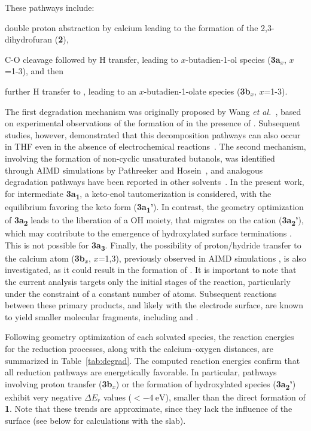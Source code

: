 \documentclass[twoside,twocolumn,9pt]{article}
\begin{document}
These pathways include: {\begin{inparaenum}[(i)]
	\item double proton abstraction by calcium leading to the formation of the 2,3-dihydrofuran (\textbf{2}),
	\item C-O cleavage followed by H transfer, leading to $x$-butadien-1-ol species (\textbf{3a}$_x$, $x$=1-3), and then
	\item further H transfer to , leading to an $x$-butadien-1-olate species (\textbf{3b}$_x$, $x$=1-3).
\end{inparaenum}
The first degradation mechanism was originally proposed by Wang \textit{et al.}~\cite{wangPlatingStrippingCalcium2018}, based on experimental observations of the formation of  in the presence of . 
Subsequent studies, however, demonstrated that this decomposition pathways can also occur in THF even in the absence of electrochemical reactions~\cite{taUnderstandingCaElectrodeposition2019}. 
The second mechanism, involving the formation of non-cyclic unsaturated butanols, was identified through AIMD simulations by Pathreeker and Hosein~\cite{pathreekerWhyTetrahydrofuranGood2021}, and analogous degradation pathways have been reported in other solvents~\cite{yamijalaStabilityCalciumIon2021}. 
In the present work, for intermediate \textbf{3a\textsubscript{1}}, a keto-enol tautomerization is considered, with the equilibrium favoring the keto form (\textbf{3a\textsubscript{1}'}). 
In contrast, the geometry optimization of \textbf{3a\textsubscript{2}} leads to the liberation of a OH moiety, that migrates on the  cation  (\textbf{3a\textsubscript{2}'}), which may contribute to the emergence of hydroxylated surface terminations \cite{fujimoriInteractionWaterCaO2016a}. 
This is not possible for \textbf{3a\textsubscript{3}}.
Finally, the possibility of proton/hydride transfer to the calcium atom (\textbf{3b}$_x$, $x$=1,3), previously observed in AIMD simulations \cite{pathreekerWhyTetrahydrofuranGood2021}, is also investigated, as it could result in the formation of . 
It is important to note that the current analysis targets only the initial stages of the reaction, particularly under the constraint of a constant number of atoms. 
Subsequent reactions between these primary products, and likely with the electrode surface, are known to yield smaller molecular fragments, including  and  \cite{taUnderstandingCaElectrodeposition2019,melemedImpactDifferentialCa22023}.

Following geometry optimization of each solvated species, the reaction energies for the reduction processes, along with the calcium–oxygen distances, are summarized in Table~\ref{tab:degrad}. The computed reaction energies confirm that all reduction pathways are energetically favorable. In particular, pathways involving proton transfer (\textbf{3b}$_x$) or the formation of hydroxylated species (\textbf{3a\textsubscript{2}'}) exhibit very negative $\Delta E_r$ values  ($< \SI{-4}{\electronvolt}$), smaller than the direct formation of \textbf{1}. 
Note that these trends are approximate, since they lack the influence of the surface (see below for calculations with the slab).

}
\end{document}
